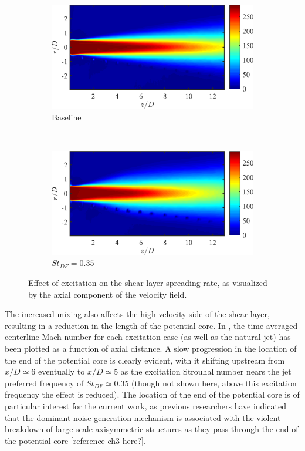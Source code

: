 \begin{figure}
	\centering
	\begin{subfigure}{0.75\textwidth}
		\centering
		\includegraphics[width=0.95\linewidth]{Figures/ch4_St000_Um.png}
		\caption{Baseline}
	\end{subfigure}\\
	\begin{subfigure}{0.75\textwidth}
		\centering
		\includegraphics[width=0.95\linewidth]{Figures/ch4_St035_Um.png}
		\caption{$St_{DF} = 0.35$}
	\end{subfigure}
	\caption{Effect of excitation on the shear layer spreading rate, as visualized by the axial component of the velocity field.}
	\label{fig:ch4_shearlayerspreading}
\end{figure}

The increased mixing also affects the high-velocity side of the shear layer, resulting in a reduction in the length of the potential core.
In , the time-averaged centerline Mach number for each excitation case (as well as the natural jet) has been plotted as a function of axial distance.
A slow progression in the location of the end of the potential core is clearly evident, with it shifting upstream from $x/D \simeq 6$ eventually to $x/D \simeq 5$ as the excitation Strouhal number nears the jet preferred frequency of $St_{DF} \simeq 0.35$ (though not shown here, above this excitation frequency the effect is reduced).
The location of the end of the potential core is of particular interest for the current work, as previous researchers have indicated that the dominant noise generation mechanism is associated with the violent breakdown of large-scale axisymmetric structures as they pass through the end of the potential core \citep{Hileman2005} [reference ch3 here?].


